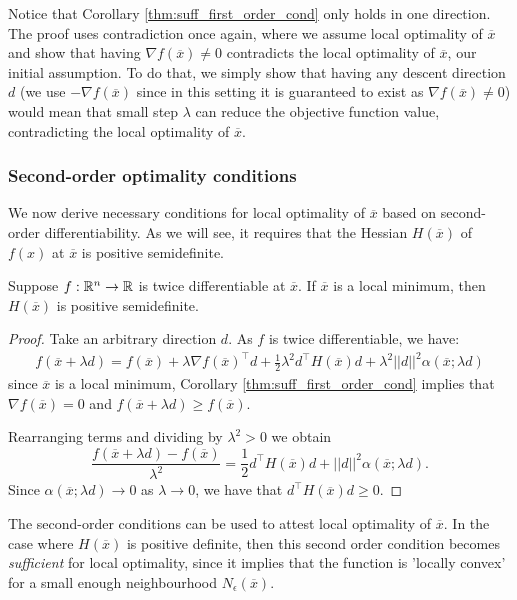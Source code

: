 Notice that Corollary \ref{thm:suff_first_order_cond} only holds in one direction. The proof uses contradiction once again, where we assume local optimality of $\overline{x}$ and show that having $\nabla f(\overline{x}) \neq 0$ contradicts the local optimality of $\overline{x}$, our initial assumption. To do that, we simply show that having any descent direction $d$ (we use $-\nabla f(\overline{x})$ since in this setting it is guaranteed to exist as $\nabla f(\overline{x}) \neq 0$) would mean that small step $\lambda$ can reduce the objective function value, contradicting the local optimality of $\overline{x}$. 


\subsubsection{Second-order optimality conditions}

We now derive necessary conditions for local optimality of $\overline{x}$ based on second-order differentiability. As we will see, it requires that the Hessian $H(\overline{x})$ of $f(x)$ at $\overline{x}$ is positive semidefinite.
%
\begin{theorem}\label{thm:second_order}
Suppose $f: \mathbb{R}^n \rightarrow \mathbb{R}$ is twice differentiable at $\overline{x}$. If $\overline{x}$ is a local minimum, then $H(\overline{x})$ is positive semidefinite.
\end{theorem}
%
\begin{proof}
Take an arbitrary direction $d$. As $f$ is twice differentiable, we have:
%
\begin{align*}
f(\overline{x} + \lambda d) = f(\overline{x}) + \lambda \nabla f(\overline{x})^\top d + \frac{1}{2}\lambda^ 2d^\top H(\overline{x}) d + \lambda^2||d||^2\alpha(\overline{x}; \lambda d)
\end{align*}
%
since $\overline{x}$ is a local minimum, Corollary \ref{thm:suff_first_order_cond} implies that $\nabla f(\overline{x})=0$ and $f(\overline{x} + \lambda d) \geq f(\overline{x})$. 

Rearranging terms and dividing by $\lambda^2 > 0$ we obtain
$$\frac{f(\overline{x} + \lambda d)-f(\overline{x})}{\lambda^2} =  \frac{1}{2}d^\top H(\overline{x}) d+ ||d||^2\alpha(\overline{x};\lambda d).
$$
Since $\alpha(\overline{x};\lambda d) \rightarrow 0$ as $\lambda \rightarrow 0$, we have that $d^\top H(\overline{x}) d \geq 0$.
\end{proof}

The second-order conditions can be used to attest local optimality of $\overline{x}$. In the case where $H(\overline{x})$ is positive definite, then this second order condition becomes \emph{sufficient} for local optimality, since it implies that the function is 'locally convex' for a small enough neighbourhood $N_\epsilon(\overline{x})$.


